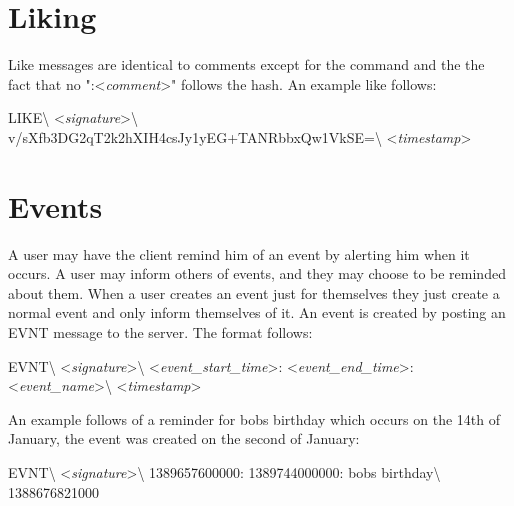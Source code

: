 \section{Liking}
Like messages are identical to comments except for the command and the the fact
that no ":\textless \textit{comment}\textgreater" follows the hash. An example
like follows:

\begin{center}
LIKE\textbackslash
\textless \textit{signature}\textgreater\textbackslash
v/sXfb3DG2qT2k2hXIH4csJy1yEG+TANRbbxQw1VkSE=\textbackslash
\textless \textit{timestamp}\textgreater
\end{center}

\section{Events}
A user may have the client remind him of an event by alerting him when it
occurs. A user may inform others of events, and they may choose to be reminded
about them. When a user creates an event just for themselves they just create a
normal event and only inform themselves of it. An event is created by posting an
EVNT message to the server. The format follows:

\begin{center}
EVNT\textbackslash
\textless \textit{signature}\textgreater\textbackslash
\textless \textit{event\_start\_time}\textgreater:
\textless \textit{event\_end\_time}\textgreater:
\textless \textit{event\_name}\textgreater\textbackslash
\textless \textit{timestamp}\textgreater
\end{center}

An example follows of a reminder for bobs birthday which occurs on the 14th of
January, the event was created on the second of January:

\begin{center}
EVNT\textbackslash
\textless \textit{signature}\textgreater\textbackslash
1389657600000:
1389744000000:
bobs birthday\textbackslash
1388676821000
\end{center}
